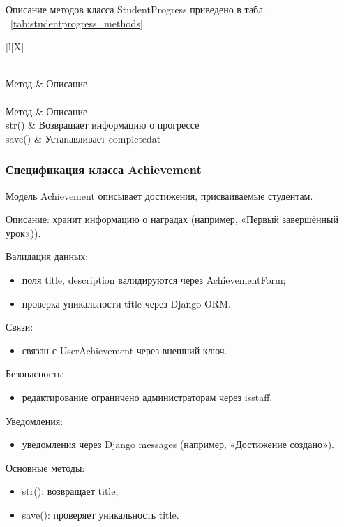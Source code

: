 Описание методов класса StudentProgress приведено в табл. ~\ref {tab:studentprogress_methods}

\begin{xltabular}{\textwidth}{|l|X|}
	\caption{Методы класса StudentProgress\label{tab:studentprogress_methods}}\\
	\hline
	Метод & Описание \\ \hline
	\endfirsthead
	\\
	\hline
	Метод & Описание \\ \hline
	\endhead
	str() & Возвращает информацию о прогрессе \\ \hline
	save() & Устанавливает completedat \\ \hline
\end{xltabular}

\subsubsection{Спецификация класса Achievement}

Модель Achievement описывает достижения, присваиваемые студентам.


Описание: хранит информацию о наградах (например, «Первый завершённый урок»)).

Валидация данных:
	\begin{itemize}
		\item поля title, description валидируются через AchievementForm;
		\item проверка уникальности title через Django ORM.
	\end{itemize}
	
Связи:
	\begin{itemize}
		\item связан с UserAchievement через внешний ключ.
	\end{itemize}
	
Безопасность:
	\begin{itemize}
		\item редактирование ограничено администраторам через isstaff.
	\end{itemize}
	
Уведомления:
	\begin{itemize}
		\item уведомления через Django messages (например, «Достижение создано»).
	\end{itemize}
	
Основные методы:
	\begin{itemize}
		\item str(): возвращает title;
		\item save(): проверяет уникальность title.
	\end{itemize}
	
